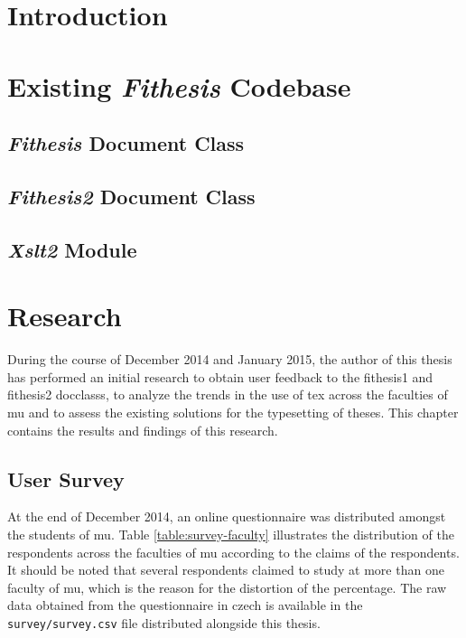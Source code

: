   \begin{ThesisAbstract}
    \blindtext
  \end{ThesisAbstract}

  \begin{ThesisKeyWords}
    \blindtext
  \end{ThesisKeyWords}

  \tableofcontents
  \listoftables
  \listoffigures

  \MainMatter
  \chapter{Introduction}
    \blindtext

  \chapter{Existing \emph{Fithesis} Codebase}
    \blindtext
    
    \section{\emph{Fithesis} Document Class}
    \blindtext

    \section{\emph{Fithesis2} Document Class}
    \blindtext

    \section{\emph{Xslt2} Module}
    \blindtext

  \chapter{Research}
  During the course of December 2014 and January 2015, the author of this thesis has performed an initial research to obtain user feedback to the fithesis1 and fithesis2 \glspl{docclass}, to analyze the trends in the use of \gls{tex} across the faculties of \gls{mu} and to assess the existing solutions for the typesetting of theses. This chapter contains the results and findings of this research.

    \section{User Survey}
    At the end of December 2014, an online questionnaire was distributed amongst the students of \gls{mu}. Table \ref{table:survey-faculty} illustrates the distribution of the respondents across the faculties of \gls{mu} according to the claims of the respondents. It should be noted that several respondents claimed to study at more than one faculty of \gls{mu}, which is the reason for the distortion of the percentage. The raw data obtained from the questionnaire in czech is available in the \texttt{survey/survey.csv} file distributed alongside this thesis.

